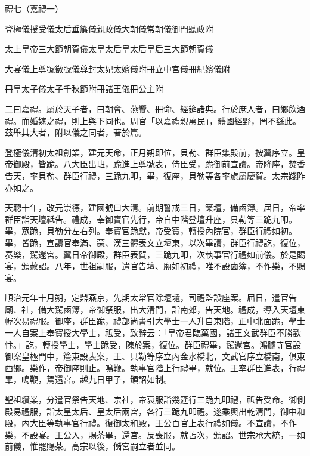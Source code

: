 
\begin{pinyinscope}
禮七（嘉禮一）

登極儀授受儀太后垂簾儀親政儀大朝儀常朝儀御門聽政附

太上皇帝三大節朝賀儀太皇太后皇太后皇后三大節朝賀儀

大宴儀上尊號徽號儀尊封太妃太嬪儀附冊立中宮儀冊紀嬪儀附

冊皇太子儀太子千秋節附冊諸王儀冊公主附

二曰嘉禮。屬於天子者，曰朝會、燕饗、冊命、經筵諸典。行於庶人者，曰鄉飲酒禮。而婚嫁之禮，則上與下同也。周官「以嘉禮親萬民」，體國經野，罔不繇此。茲舉其大者，附以儀之同者，著於篇。

登極儀清初太祖創業，建元天命，正月朔即位，貝勒、群臣集殿前，按翼序立。皇帝御殿，皆跪。八大臣出班，跪進上尊號表，侍臣受，跪御前宣讀。帝降座，焚香告天，率貝勒、群臣行禮，三跪九叩，畢，復座，貝勒等各率旗屬慶賀。太宗踐阼亦如之。

天聰十年，改元崇德，建國號曰大清。前期誓戒三日，築壇，備鹵簿。屆日，帝率群臣詣天壇祗告。禮成，奉御寶官先行，帝自中階登壇升座，貝勒等三跪九叩。畢，眾跪，貝勒分左右列。奉寶官跪獻，帝受寶，轉授內院官，群臣行禮如初。畢，皆跪，宣讀官奉滿、蒙、漢三體表文立壇東，以次畢讀，群臣行禮訖，復位，奏樂，駕還宮。翼日帝御殿，群臣表賀，三跪九叩，次執事官行禮如前儀。於是賜宴，頒赦詔。八年，世祖嗣服，遣官告壇、廟如初禮，唯不設鹵簿，不作樂，不賜宴。

順治元年十月朔，定鼎燕京，先期太常官除壇壝，司禮監設座案。屆日，遣官告廟、社，備大駕鹵簿，帝御祭服，出大清門，詣南郊，告天地。禮成，導入天壇東幄次易禮服。御座，群臣跪，禮部尚書引大學士一人升自東階，正中北面跪，學士一人自案上奉寶授大學士，祗受，致辭云：「皇帝君臨萬國，諸王文武群臣不勝歡忭。」訖，轉授學士，學士跪受，陳於案，復位。群臣禮畢，駕還宮。鴻臚寺官設御案皇極門中，簷東設表案，王、貝勒等序立內金水橋北，文武官序立橋南，俱東西鄉。樂作，帝御座則止。鳴鞭。執事官階上行禮畢，就位。王率群臣進表，行禮畢，鳴鞭，駕還宮。越九日甲子，頒詔如制。

聖祖纘業，分遣官祭告天地、宗社，帝衰服詣幾筵行三跪九叩禮，祗告受命。御側殿易禮服，詣太皇太后、皇太后兩宮，各行三跪九叩禮。遂乘輿出乾清門，御中和殿，內大臣等執事官行禮。復御太和殿，王公百官上表行禮如儀。不宣讀，不作樂，不設宴。王公入，賜茶畢，還宮。反喪服，就苫次，頒詔。世宗承大統，一如前儀，惟罷賜茶。高宗以後，儲宮嗣立者並同。


\end{pinyinscope}
